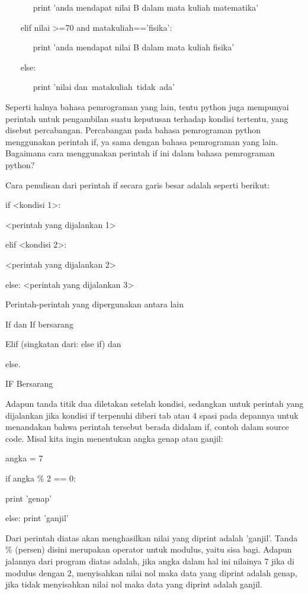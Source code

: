  
~~~~~~ print 'anda mendapat nilai B dalam mata kuliah matematika' 

 
~~~ elif nilai >=70 and matakuliah=='fisika': 

 
~~~~~~ print 'anda mendapat nilai B dalam mata kuliah fisika' 

 
~~~ else: 

 
~~~~~~ print 'nilai dan~matakuliah~tidak~ada'~~~     

 
Seperti halnya bahasa pemrograman yang lain, tentu python juga mempunyai perintah untuk pengambilan suatu keputusan terhadap kondisi tertentu, yang disebut percabangan. Percabangan pada bahasa pemrograman python menggunakan perintah if, ya sama dengan bahasa pemrograman yang lain. Bagaimana cara menggunakan perintah if ini dalam bahasa pemrograman python? 
 

Cara penulisan dari perintah if secara garis besar adalah seperti berikut: 
 


if <kondisi 1>: 
 

   <perintah yang dijalankan 1> 
 

elif <kondisi 2>: 
 

<perintah yang dijalankan 2> 
 

else:
   <perintah yang dijalankan 3> 
 


Perintah-perintah yang dipergunakan antara lain 
 

If dan If bersarang 
 

Elif (singkatan dari: else if) dan 
 

else.
 
 

IF Bersarang 
 

Adapun tanda titik dua diletakan setelah kondisi, sedangkan untuk perintah yang dijalankan jika kondisi if terpenuhi diberi tab atau 4 spasi pada depannya untuk menandakan bahwa perintah tersebut berada didalam if, contoh dalam source code. Misal kita ingin menentukan angka genap atau ganjil: 
 

angka = 7 
 

if angka    \%   2 == 0: 
 

        print 'genap' 
 

else:
   print 'ganjil' 
 

 Dari perintah diatas akan menghasilkan nilai yang diprint adalah 'ganjil'. Tanda    \%   (persen) disini merupakan operator untuk modulus, yaitu sisa bagi. Adapun jalannya dari program diatas adalah, jika angka dalam hal ini nilainya 7 jika di modulus dengan 2, menyisahkan nilai nol maka data yang diprint adalah genap, jika tidak menyisahkan nilai nol maka data yang diprint adalah ganjil. 
 

